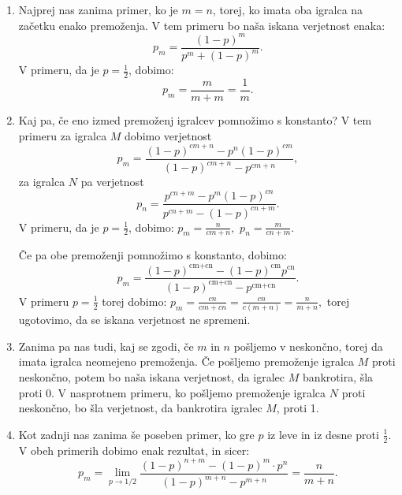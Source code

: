\documentclass[12pt, a4paper]{article}
\begin{document}
\begin{enumerate}
\item Najprej nas zanima primer, ko je $m = n$, torej, ko imata oba igralca na začetku enako premoženja. V tem primeru bo naša iskana verjetnost enaka: 
$$p_m = \frac{(1-p)^m}{p^m+(1-p)^m}.$$
V primeru, da je $p = \frac{1}{2}$, dobimo: 
$$p_m = \frac{m}{m + m} = \frac{1}{m}.$$

\item Kaj pa, če eno izmed premoženj igralcev pomnožimo s konstanto? V tem primeru za igralca $M$ dobimo verjetnost
$$p_m = \frac{(1-p)^{c m+n}-p^n (1-p)^{c m}}{(1-p)^{c m+n}-p^{c m+n}},$$ za igralca $N$ pa verjetnost
$$p_n = \frac{p^{c n+m}-p^m (1-p)^{c n}}{p^{c n+m}-(1-p)^{c n+m}}.$$
V primeru, da je $p = \frac{1}{2}$, dobimo: 
$p_m = \frac{n}{cm + n},$ $p_n = \frac{m}{cn + m}.$

Če pa obe premoženji pomnožimo s konstanto, dobimo:
$$p_m = \frac{(1-p)^{\text{cm}+\text{cn}}-(1-p)^{\text{cm}} p^{\text{cn}}}{(1-p)^{\text{cm}+\text{cn}}-p^{\text{cm}+\text{cn}}}.$$
V primeru $p = \frac{1}{2}$ torej dobimo: 
$p_m = \frac{cn}{cm + cn} = \frac{cn}{c(m + n)} = \frac{n}{m + n},$ torej ugotovimo, da se iskana verjetnost ne spremeni. 

\item Zanima pa nas tudi, kaj se zgodi, če $m$ in $n$ pošljemo v neskončno, torej da imata igralca neomejeno premoženja.
Če pošljemo premoženje igralca $M$ proti neskončno, potem bo naša iskana verjetnost, da igralec $M$ bankrotira, šla proti 0. V nasprotnem primeru, ko pošljemo premoženje igralca $N$ proti neskončno, bo šla verjetnost, da bankrotira igralec $M$, proti 1.

\item Kot zadnji nas zanima še poseben primer, ko gre $p$ iz leve in iz desne proti $\frac{1}{2}$. V obeh primerih dobimo enak rezultat, in sicer: 
$$p_m = \lim_{p \to 1/2}  \frac{(1-p)^{n+m} - (1-p)^m \cdot p^n}{(1-p)^{m+n} - p^{m+n}}  =\frac{n}{m + n}.$$

\end{enumerate}

\newpage
\end{document}
